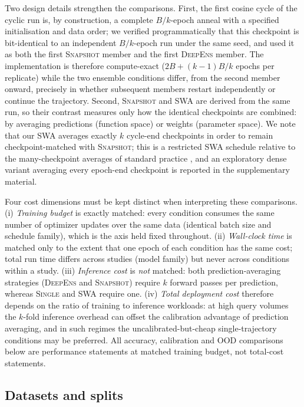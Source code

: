 \documentclass[11pt,a4paper]{article}
\newcommand{\deepens}{\textsc{DeepEns}}
\newcommand{\snapshot}{\textsc{Snapshot}}
\newcommand{\swa}{\textsc{SWA}}
\newcommand{\single}{\textsc{Single}}
\begin{document}
Two design details strengthen the comparisons. First, the first cosine
cycle of the cyclic run is, by construction, a complete $B/k$-epoch anneal
with a specified initialisation and data order; we verified
programmatically that this checkpoint is bit-identical to an independent
$B/k$-epoch run under the same seed, and used it as both the first
\snapshot{} member and the first \deepens{} member. The implementation is
therefore compute-exact ($2B + (k{-}1)B/k$ epochs per replicate) while the two
ensemble conditions differ, from the second member onward, precisely in
whether subsequent members restart independently or continue the
trajectory. Second, \snapshot{} and \swa{} are derived from the same run, so
their contrast measures only how the identical checkpoints are combined: by
averaging predictions (function space) or weights (parameter space). We
note that our \swa{} averages exactly $k$ cycle-end checkpoints in order to
remain checkpoint-matched with \snapshot{}; this is a restricted \swa{}
schedule relative to the many-checkpoint averages of standard practice
\citep{izmailov2018}, and an exploratory dense variant averaging every
epoch-end checkpoint is reported in the supplementary material.

Four cost dimensions must be kept distinct when interpreting these
comparisons. (i) \emph{Training budget} is exactly matched: every condition
consumes the same number of optimizer updates over the same data (identical
batch size and schedule family), which is the axis held fixed throughout.
(ii) \emph{Wall-clock time} is matched only to the extent that one epoch of
each condition has the same cost; total run time differs across studies
(model family) but never across conditions within a study. (iii)
\emph{Inference cost} is \emph{not} matched: both prediction-averaging
strategies (\deepens{} and \snapshot{}) require $k$ forward passes per
prediction, whereas \single{} and \swa{} require one. (iv) \emph{Total
deployment cost} therefore depends on the ratio of training to inference
workloads: at high query volumes the $k$-fold inference overhead can offset
the calibration advantage of prediction averaging, and in such regimes the
uncalibrated-but-cheap single-trajectory conditions may be preferred. All
accuracy, calibration and OOD comparisons below are performance statements
at matched training budget, not total-cost statements.

\subsection{Datasets and splits}\label{sec:datasets}
\end{document}
